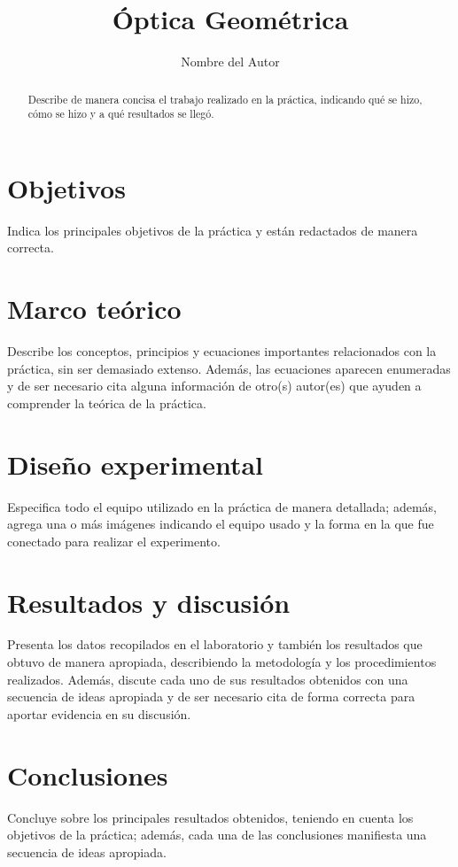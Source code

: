 \documentclass[twocolumn,a4paper,11pt]{scrartcl}
\title{Óptica Geométrica}
\author{Nombre del Autor}
\date{}
\begin{document}
\maketitle

\begin{abstract}
Describe de manera concisa el trabajo realizado en la práctica, indicando qué se hizo, cómo se hizo y a qué resultados se llegó.
\end{abstract}

\section{Objetivos}
Indica los principales objetivos de la práctica y están redactados de manera correcta.

\section{Marco teórico}
Describe los conceptos, principios y ecuaciones importantes relacionados con la práctica, sin ser demasiado extenso. Además, las ecuaciones aparecen enumeradas y de ser necesario cita alguna información de otro(s) autor(es) que ayuden a comprender la teórica de la práctica.

\section{Diseño experimental}
Especifica todo el equipo utilizado en la práctica de manera detallada; además, agrega una o más imágenes indicando el equipo usado y la forma en la que fue conectado para realizar el experimento.

\section{Resultados y discusión}
Presenta los datos recopilados en el laboratorio y también los resultados que obtuvo de manera apropiada, describiendo la metodología y los procedimientos realizados. Además, discute cada uno de sus resultados obtenidos con una secuencia de ideas apropiada y de ser necesario cita de forma correcta para aportar evidencia en su discusión.


\section{Conclusiones}
Concluye sobre los principales resultados obtenidos, teniendo en cuenta los objetivos de la práctica; además, cada una de las conclusiones manifiesta una secuencia de ideas apropiada.


\end{document}
